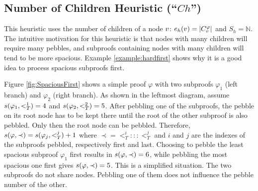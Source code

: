 \documentclass{llncs}
\newcommand{\Children}[2]{C_{#1}^{#2}}
\begin{document}
\subsection{Number of Children Heuristic (``$Ch$'')}
\label{sec:children}
This heuristic uses the number of children of a node $v$: $e_h(\n) = |\Children{\n}{\varphi}|$ and $S_h = \mathbb{N}$.
The intuitive motivation for this heuristic is that nodes with many children will require many pebbles, and subproofs containing nodes with many children will tend to be more spacious. Example \ref{example:hardfirst} shows why it is a good idea to process spacious subproofs first.

\begin{example}
Figure \ref{fig:SpaciousFirst} shows a simple proof $\varphi$ with two subproofs $\varphi_1$ (left branch) and $\varphi_2$ (right branch). As shown in the leftmost diagram, assume $s(\varphi_1,<^1_T) = 4$ and $s(\varphi_2,<^2_T) = 5$.
After pebbling one of the subproofs, the pebble on its root node has to be kept there until the root of the other subproof is also pebbled. Only then the root node can be pebbled. Therefore, $s(\varphi,\prec) = s(\varphi_j,<^j_T) + 1$ where $\prec = <^i_T ::: <^j_T$ and $i$ and $j$ are the indexes of the subproofs pebbled, respectively first and last. 
Choosing to pebble the least spacious subproof $\varphi_1$ first results in $s(\varphi,\prec) = 6$, while pebbling the most spacious one first gives $s(\varphi,\prec) = 5$.
This is a simplified situation. The two subproofs do not share nodes. Pebbling one of them does not influence the pebble number of the other.


\end{example}
\end{document}
